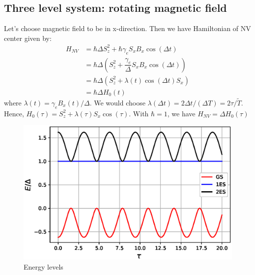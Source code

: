 \documentclass[11pt,a4paper]{article}
\begin{document}
\subsection*{Three level system: rotating magnetic field}

Let's choose magnetic field to be in x-direction. Then we have Hamiltonian of NV center given by:
\begin{align*}
H_{NV} &= \hbar \Delta S_z^2 + \hbar \gamma_e   S_x  B_x \cos (\Delta t) \\
&= \hbar \Delta (S_z^2 +  \dfrac{\gamma_e}{\Delta}   S_x B_x \cos (\Delta t)) \\
&= \hbar \Delta (S_z^2 +  \lambda(t)\cos (\Delta t) S_x  ) \\
&=  \hbar \Delta H_0(t)
\end{align*}
where $\lambda(t)= \gamma_e B_x( t)  / \Delta $. We would choose $\lambda( \Delta t)= 2 \Delta t/(\Delta T)= 2 \tau/ \tilde{T}$. Hence, $H_0(\tau)=S_z^2 +  \lambda(\tau) S_x   \cos (\tau)$. With $\hbar=1$, we have $H_{NV}=\Delta H_0(\tau)$

\begin{figure}[!ht]
\begin{center}
\includegraphics[scale=0.5]{pics/energy_NV_cosine.eps} 
\caption{Energy levels}
\label{energy_lz_2}
\end{center}
\end{figure}

\end{document}
